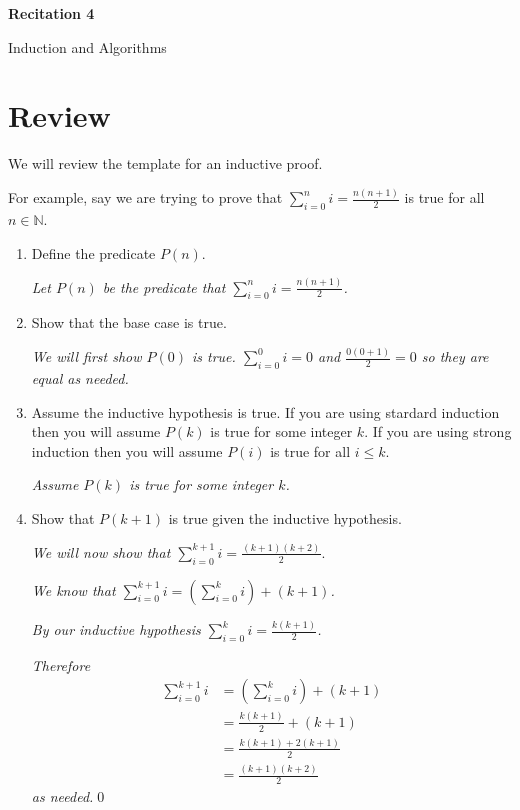 \documentclass[12pt,letterpaper]{article}
\newcommand\N{\mathbb N}
\begin{document}
  \thispagestyle{firstpagestyle}
  \begin{center}
    {\large \textbf{Recitation 4}}
    
    {\large Induction and Algorithms}
  \end{center}
  
 \section*{Review}

      We will review the template for an inductive proof.

      For example, say we are trying to prove that $\sum_{i=0}^n i = \frac{n(n+1)}{2}$ is true for all $n \in \N$. 

      \begin{enumerate}
        \item Define the predicate $P(n)$.

        \textit{Let $P(n)$ be the predicate that $\sum_{i=0}^n i = \frac{n(n+1)}{2}$.}

        \item Show that the base case is true.

        \textit{We will first show $P(0)$ is true. $\sum_{i=0}^0 i = 0$ and $\frac{0(0+1)}{2} = 0$ so they are equal as needed.}

        \item Assume the inductive hypothesis is true. If you are using stardard induction then you will assume 
			$P(k)$ is true for some integer $k$. If you are using strong induction then you will assume $P(i)$ is true for all $i \leq k$.

        \textit{Assume $P(k)$ is true for some integer $k$.}

        \item Show that $P(k+1)$ is true given the inductive hypothesis.

		\textit{We will now show that  $\sum_{i=0}^{k+1} i = \frac{(k+1)(k+2)}{2}$}.

       	\textit{We know that $\sum_{i=0}^{k+1} i = \left( \sum_{i=0}^{k} i \right)+ (k+1)$.}

		\textit{By our inductive hypothesis $\sum_{i=0}^k i = \frac{k(k+1)}{2}$.}

         \textit{Therefore}
		\begin{align*}
			\sum_{i=0}^{k+1} i &= \left( \sum_{i=0}^{k} i \right)+ (k+1) \\
			&=  \frac{k(k+1)}{2} + (k+1) \\
			&= \frac{k(k+1) + 2(k+1)}{2} \\
			&= \frac{(k+1)(k+2)}{2}
		\end{align*}
		\textit{as needed.}\qed


\end{enumerate}
\end{document}
